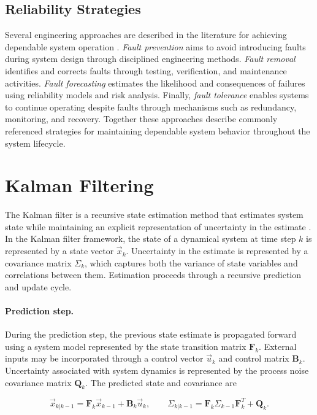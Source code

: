\subsection{Reliability Strategies}

Several engineering approaches are described in the literature for achieving dependable system operation \cite{avizienis2004basic}. \textit{Fault prevention} aims to avoid introducing faults during system design through disciplined engineering methods. \textit{Fault removal} identifies and corrects faults through testing, verification, and maintenance activities. \textit{Fault forecasting} estimates the likelihood and consequences of failures using reliability models and risk analysis. Finally, \textit{fault tolerance} enables systems to continue operating despite faults through mechanisms such as redundancy, monitoring, and recovery. Together these approaches describe commonly referenced strategies for maintaining dependable system behavior throughout the system lifecycle.



\section{Kalman Filtering}\label{sec:kalman-background}
The Kalman filter is a recursive state estimation method that estimates system state while maintaining an explicit representation of uncertainty in the estimate \cite{kalman1960filtering,bishop2001introduction}. In the Kalman filter framework, the state of a dynamical system at time step $k$ is represented by a state vector $\vec{x}_k$. Uncertainty in the estimate is represented by a covariance matrix $\Sigma_k$, which captures both the variance of state variables and correlations between them. Estimation proceeds through a recursive prediction and update cycle.

\paragraph{Prediction step.}
During the prediction step, the previous state estimate is propagated forward using a system model represented by the state transition matrix $\mathbf{F}_k$. External inputs may be incorporated through a control vector $\vec{u}_k$ and control matrix $\mathbf{B}_k$. Uncertainty associated with system dynamics is represented by the process noise covariance matrix $\mathbf{Q}_k$. The predicted state and covariance are

\[
\vec{x}_{k|k-1} = \mathbf{F}_k \vec{x}_{k-1} + \mathbf{B}_k \vec{u}_k,
\qquad
\Sigma_{k|k-1} = \mathbf{F}_k \Sigma_{k-1} \mathbf{F}_k^{T} + \mathbf{Q}_k.
\]

